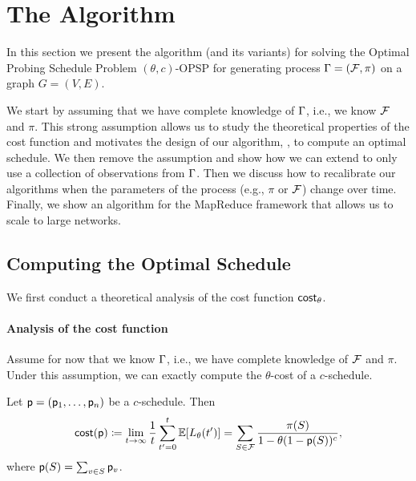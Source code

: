 \section{The \algonamebasecaps{} Algorithm}\label{sec:method}
In this section we present the algorithm \algoname
(and its variants) for solving 
the Optimal Probing Schedule Problem $(\theta,c)$-OPSP for generating process
$\Gamma=(\mathcal{F},\pi)$ on a graph $G=(V,E)$. 

We start by assuming that we have complete knowledge of $\Gamma$, i.e., we know
$\mathcal{F}$ and $\pi$. This strong assumption allows us to study the theoretical
properties of the cost function and motivates the design of our algorithm,
\algoname, to compute an optimal schedule. We then remove the assumption and show
how we can extend \algoname to only use a collection of observations from
$\Gamma$. Then we discuss how to recalibrate our algorithms when the parameters of
the process (e.g., $\pi$ or $\mathcal{F}$) change over time.  Finally, we show an
algorithm for the MapReduce framework that allows us to scale to large networks.

\subsection{Computing the Optimal Schedule}\label{sec:optimize}
We first conduct a theoretical analysis of the cost function $\mathsf{cost}_\theta$.

\paragraph{Analysis of the cost function}
Assume for now that we know $\Gamma$, i.e., we have complete knowledge of
$\mathcal{F}$ and $\pi$. Under this assumption, we can exactly compute the
$\theta$-cost of a $c$-schedule.

\begin{lemma}\label{lem:explicit}
Let $\mathsf{p}=(\mathsf{p}_1,\ldots,\mathsf{p}_n)$ be a $c$-schedule. Then
\begin{equation}\label{eq:explicit}
	\mathsf{cost}(\mathsf{p}) \coloneqq
	\lim_{t\rightarrow\infty}\frac{1}{t}\sum_{t'=0}^t\mathbb{E}[L_\theta(t')] =
	\sum_{S\in \mathcal{F}} \frac{\pi(S)}{1- \theta(1-\mathsf{p}(S))^c},
\end{equation}
where $\mathsf{p}(S) = \sum_{v\in S} \mathsf{p}_v$.
\end{lemma}


